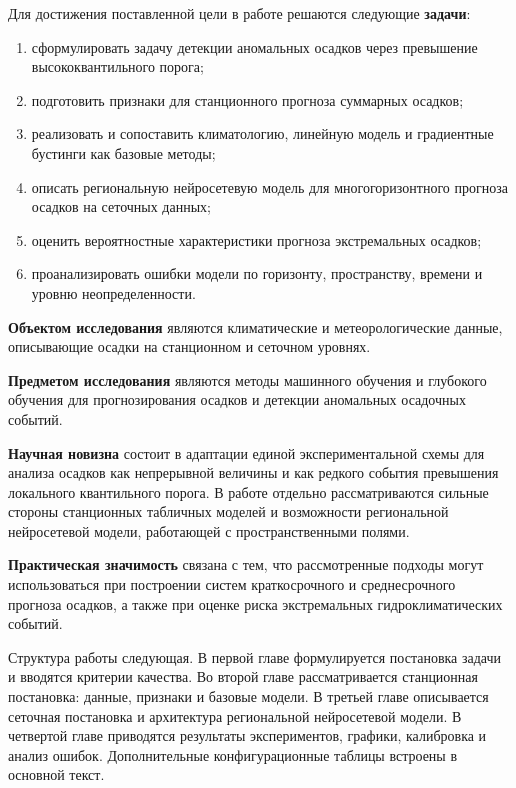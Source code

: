 Для достижения поставленной цели в работе решаются следующие \textbf{задачи}:
\begin{enumerate}[label=\arabic*)]
    \item сформулировать задачу детекции аномальных осадков через превышение высококвантильного порога;
    \item подготовить признаки для станционного прогноза суммарных осадков;
    \item реализовать и сопоставить климатологию, линейную модель и градиентные бустинги как базовые методы;
    \item описать региональную нейросетевую модель для многогоризонтного прогноза осадков на сеточных данных;
    \item оценить вероятностные характеристики прогноза экстремальных осадков;
    \item проанализировать ошибки модели по горизонту, пространству, времени и уровню неопределенности.
\end{enumerate}

\textbf{Объектом исследования} являются климатические и метеорологические данные, описывающие осадки на станционном и сеточном уровнях.

\textbf{Предметом исследования} являются методы машинного обучения и глубокого обучения для прогнозирования осадков и детекции аномальных осадочных событий.

\textbf{Научная новизна} состоит в адаптации единой экспериментальной схемы для анализа осадков как непрерывной величины и как редкого события превышения локального квантильного порога. В работе отдельно рассматриваются сильные стороны станционных табличных моделей и возможности региональной нейросетевой модели, работающей с пространственными полями.

\textbf{Практическая значимость} связана с тем, что рассмотренные подходы могут использоваться при построении систем краткосрочного и среднесрочного прогноза осадков, а также при оценке риска экстремальных гидроклиматических событий.

Структура работы следующая. В первой главе формулируется постановка задачи и вводятся критерии качества. Во второй главе рассматривается станционная постановка: данные, признаки и базовые модели. В третьей главе описывается сеточная постановка и архитектура региональной нейросетевой модели. В четвертой главе приводятся результаты экспериментов, графики, калибровка и анализ ошибок. Дополнительные конфигурационные таблицы встроены в основной текст.

